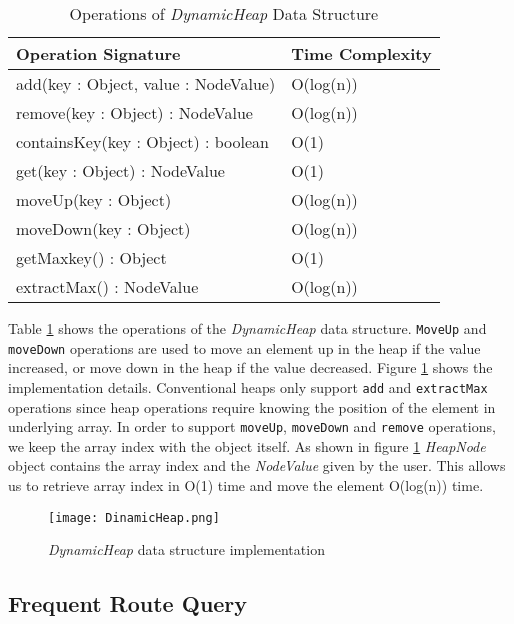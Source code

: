 \begin{table}
\centering
\caption{Operations of \textit{DynamicHeap} Data Structure}
\begin{tabular}{|l|l|} \hline
Operation Signature & Time Complexity \\ \hline \hline
add(key : Object, value : NodeValue) & O(log(n)) \\ \hline
remove(key : Object) : NodeValue & O(log(n)) \\ \hline
containsKey(key : Object) : boolean & O(1) \\ \hline
get(key : Object) : NodeValue & O(1) \\ \hline
moveUp(key : Object) & O(log(n)) \\ \hline
moveDown(key : Object) & O(log(n)) \\ \hline
getMaxkey() : Object & O(1) \\ \hline
extractMax() : NodeValue & O(log(n)) \\ \hline
\end{tabular}
\label{dynamicheap_api}
\end{table}

Table \ref{dynamicheap_api} shows the operations of the \textit{DynamicHeap} data structure. \texttt{MoveUp} and \texttt{moveDown} operations are used to move an element up in the heap if the value increased, or move down in the heap if the value decreased. Figure \ref{dynamicheap_impl} shows the implementation details. Conventional heaps only support \texttt{add} and \texttt{extractMax} operations since heap operations require knowing the position of the element in underlying array. In order to support \texttt{moveUp}, \texttt{moveDown} and \texttt{remove} operations, we keep the array index with the object itself. As shown in figure \ref{dynamicheap_impl} \textit{HeapNode} object contains the array index and the \textit{NodeValue} given by the user. This allows us to retrieve array index in O(1) time and move the element O(log(n)) time.


\begin{figure}[!t]
        \centering
        \texttt{[image: DinamicHeap.png]}
        \caption{\textit{DynamicHeap} data structure implementation}
        \label{dynamicheap_impl}
\end{figure}

\subsection{Frequent Route Query}

